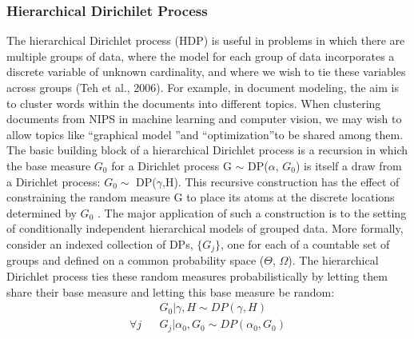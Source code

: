 \documentclass{article}
\begin{document}
\subsubsection{Hierarchical Dirichilet Process}
The hierarchical Dirichlet process (HDP) is useful in problems in which there are multiple groups of data, where the model for each group of data incorporates a discrete variable of unknown cardinality, 
and where we wish to tie these variables across groups (Teh et al., 2006).
For example, in document modeling, the aim is to cluster words within the documents into different topics. 
When clustering documents from NIPS in machine learning and  computer vision, 
we may wish to allow topics like \textquotedblleft graphical model \textquotedblright and \textquotedblleft optimization\textquotedblright to be shared among them.\\ 

The basic building block of a hierarchical Dirichlet process is a recursion in
which the base measure $G_{0}$ for a Dirichlet process G $\sim$ DP($\alpha$, $G_{0}$) is itself a draw
from a Dirichlet process: $G_{0}\sim$ DP($\gamma$,H). This recursive construction has the
effect of constraining the random measure G to place its atoms at the discrete
locations determined by $G_{0}$ . The major application of such a construction is to
the setting of conditionally independent hierarchical models of grouped data.
More formally, consider an indexed collection of DPs, $\{G_{j}\}$, one for each of a
countable set of groups and defined on a common probability space ($\Theta$, $\Omega$). The
hierarchical Dirichlet process ties these random measures probabilistically by
letting them share their base measure and letting this base measure be random:
\begin{eqnarray*}
 & &G_{0}|\gamma,H \sim DP(\gamma,H)\\
\forall j & &G_{j}|\alpha_{0},G_{0} \sim DP(\alpha_{0},G_{0}) 
\end{eqnarray*}
\end{document}
